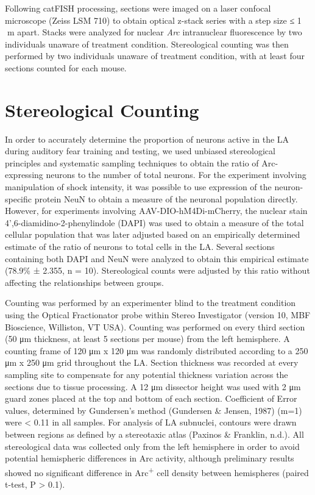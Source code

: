 \documentclass[12pt,a4paperpaper,]{report}
\begin{document}
Following catFISH processing, sections were imaged on a laser confocal
microscope (Zeiss LSM 710) to obtain optical z-stack series with a step
size ≤ 1 m apart. Stacks were analyzed for nuclear \emph{Arc}
intranuclear fluorescence by two individuals unaware of treatment
condition. Stereological counting was then performed by two individuals
unaware of treatment condition, with at least four sections counted for
each mouse.

\section{Stereological Counting}\label{stereological-counting}

In order to accurately determine the proportion of neurons active in the
LA during auditory fear training and testing, we used unbiased
stereological principles and systematic sampling techniques to obtain
the ratio of Arc-expressing neurons to the number of total neurons. For
the experiment involving manipulation of shock intensity, it was
possible to use expression of the neuron-specific protein NeuN to obtain
a measure of the neuronal population directly. However, for experiments
involving AAV-DIO-hM4Di-mCherry, the nuclear stain
4',6-diamidino-2-phenylindole (DAPI) was used to obtain a measure of the
total cellular population that was later adjusted based on an
empirically determined estimate of the ratio of neurons to total cells
in the LA. Several sections containing both DAPI and NeuN were analyzed
to obtain this empirical estimate (78.9\% ± 2.355, n = 10).
Stereological counts were adjusted by this ratio without affecting the
relationships between groups.

Counting was performed by an experimenter blind to the treatment
condition using the Optical Fractionator probe within Stereo
Investigator (version 10, MBF Bioscience, Williston, VT USA). Counting
was performed on every third section (50 μm thickness, at least 5
sections per mouse) from the left hemisphere. A counting frame of 120 μm
x 120 μm was randomly distributed according to a 250 μm x 250 μm grid
throughout the LA. Section thickness was recorded at every sampling site
to compensate for any potential thickness variation across the sections
due to tissue processing. A 12 μm dissector height was used with 2 μm
guard zones placed at the top and bottom of each section. Coefficient of
Error values, determined by Gundersen's method (Gundersen \& Jensen,
1987) (m=1) were \textless{} 0.11 in all samples. For analysis of LA
subnuclei, contours were drawn between regions as defined by a
stereotaxic atlas (Paxinos \& Franklin, n.d.). All stereological data
was collected only from the left hemisphere in order to avoid potential
hemispheric differences in Arc activity, although preliminary results
showed no significant difference in Arc\textsuperscript{+} cell density
between hemispheres (paired t-test, P \textgreater{} 0.1).
\end{document}

